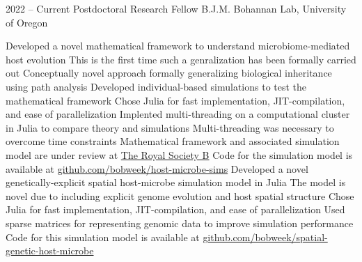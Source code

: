 \documentclass[9pt]{developercv} %
\begin{document}
\vspace{-5 pt}
\begin{entrylist}
	\entry
        {2022 -- Current}
		{Postdoctoral Research Fellow}
		{B.J.M. Bohannan Lab, University of Oregon}
            {\vspace{-10 pt}\begin{outline}[itemize]
                    \1 Developed a novel mathematical framework to understand microbiome-mediated host evolution
                        \vspace{-6 pt} \2[$\cdot$] This is the first time such a genralization has been formally carried out
                        \vspace{-3 pt} \2[$\cdot$] Conceptually novel approach formally generalizing biological inheritance using path analysis
                    \vspace{-6 pt}\1 Developed individual-based simulations to test the mathematical framework
                        \vspace{-6 pt} \2[$\cdot$] Chose Julia for fast implementation, JIT-compilation, and ease of parallelization
                    \vspace{-6 pt}\1 Implented multi-threading on a computational cluster in Julia to compare theory and simulations
                        \vspace{-6 pt} \2[$\cdot$] Multi-threading was necessary to overcome time constraints
                    \vspace{-6 pt}\1 Mathematical framework and associated simulation model are under review at \href{https://royalsocietypublishing.org/journal/rspb}{\footnotesize{The Royal Society B}}
                        \vspace{-6 pt} \2[$\cdot$] Code for the simulation model is available at \href{https://github.com/bobweek/host-microbe-sims}{\footnotesize{github.com/bobweek/host-microbe-sims}}
                    \vspace{-6 pt}\1 Developed a novel genetically-explicit spatial host-microbe simulation model in Julia
                        \vspace{-6 pt} \2[$\cdot$] The model is novel due to including explicit genome evolution and host spatial structure
                        \vspace{-3 pt} \2[$\cdot$] Chose Julia for fast implementation, JIT-compilation, and ease of parallelization
                        \vspace{-3 pt} \2[$\cdot$] Used sparse matrices for representing genomic data to improve simulation performance
                        \vspace{-3 pt} \2[$\cdot$] Code for this simulation model is available at \href{https://github.com/bobweek/spatial-genetic-host-microbe}{\footnotesize{github.com/bobweek/spatial-genetic-host-microbe}}
                    

\end{outline}}
\end{entrylist}
\end{document}
